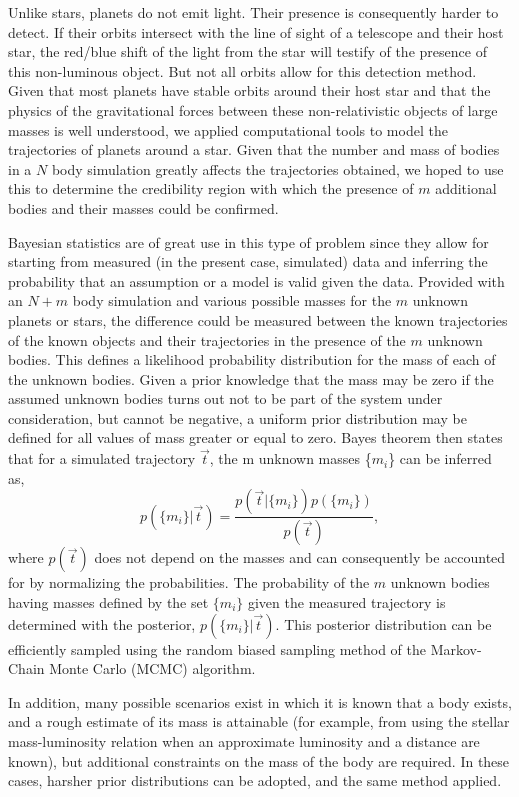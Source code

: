 \documentclass[twocolumn]{aastex63}
\begin{document}
Unlike stars, planets do not emit light. Their presence is consequently harder to detect. If their orbits intersect with the line of sight of a telescope and their host star, the red/blue shift of the light from the star will testify of the presence of this non-luminous object. But not all orbits allow for this detection method. Given that most planets have stable orbits around their host star and that the physics of the gravitational forces between these non-relativistic objects of large masses is well understood, we applied computational tools to model the trajectories of planets around a star. Given that the number and mass of bodies in a $N$ body simulation greatly affects the trajectories obtained, we hoped to use this to determine the credibility region with which the presence of $m$ additional bodies and their masses could be confirmed. 

Bayesian statistics are of great use in this type of problem since they allow for starting from measured (in the present case, simulated) data and inferring the probability that an assumption or a model is valid given the data. Provided with an $N + m$ body simulation and various possible masses for the $m$ unknown planets or stars, the difference could be measured between the known trajectories of the known objects and their trajectories in the presence of the $m$ unknown bodies. This defines a likelihood probability distribution for the mass of each of the unknown bodies. Given a prior knowledge that the mass may be zero if the assumed unknown bodies turns out not to be part of the system under consideration, but cannot be negative, a uniform prior distribution may be defined for all values of mass greater or equal to zero. Bayes theorem then states that for a simulated trajectory $\vec{t}$, the m unknown masses \{$m_i$\} can be inferred as,
\begin{equation}\label{Bayes_thm}
    p(\{m_i\}|\vec{t}) = \frac{p(\vec{t}|\{m_i\})p(\{m_i\})}{p(\vec{t})},
\end{equation}
where $p(\vec{t})$ does not depend on the masses and can consequently be accounted for by normalizing the probabilities. The probability of the $m$ unknown bodies having masses defined by the set $\{m_i\}$ given the measured trajectory is determined with the posterior, $p(\{m_i\}|\vec{t})$. This posterior distribution can be efficiently sampled using the random biased sampling method of the Markov-Chain Monte Carlo (MCMC) algorithm.

In addition, many possible scenarios exist in which it is known that a body exists, and a rough estimate of its mass is attainable (for example, from using the stellar mass-luminosity relation when an approximate luminosity and a distance are known), but additional constraints on the mass of the body are required. In these cases, harsher prior distributions can be adopted, and the same method applied. 
\end{document}
